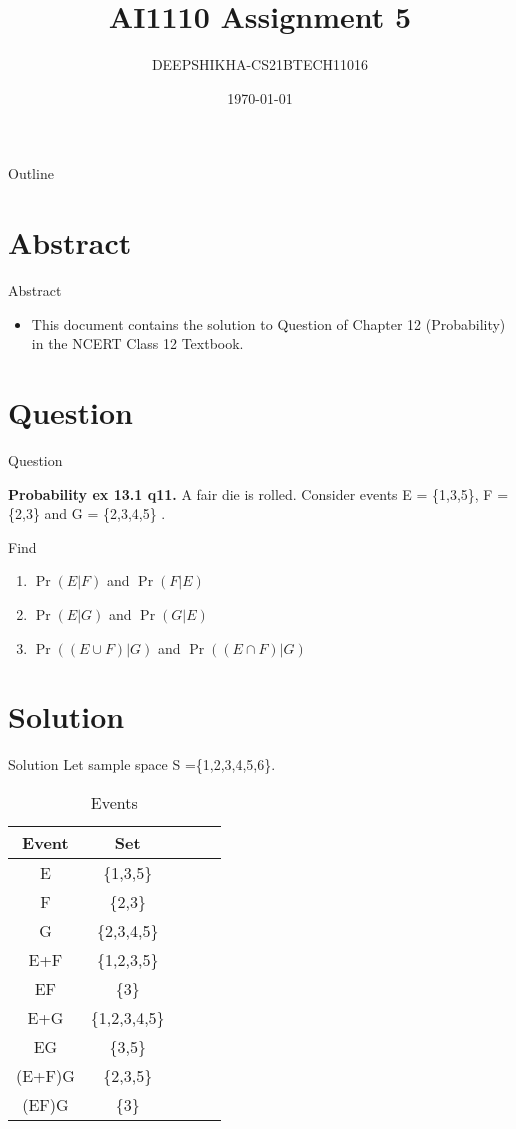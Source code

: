 \documentclass{beamer}
\title{AI1110 Assignment 5}
\author{DEEPSHIKHA-CS21BTECH11016}
\date{\today}
\providecommand{\pr}[1]{\ensuremath{\Pr\left(#1\right)}}
\begin{document}
\begin{frame}
		\titlepage
	\end{frame}

\begin{frame}{Outline}
  \tableofcontents
\end{frame}
\section{Abstract}
	\begin{frame}{Abstract}
		\begin{itemize}
			\item 	This document contains the solution to Question of Chapter 12 (Probability) in the NCERT Class 12 Textbook.
		\end{itemize}
	\end{frame}
	
	
	\section{Question}
	\begin{frame}{Question}
		\begin{block}{\textbf{Probability  ex 13.1 q11.}}
			 A fair die is rolled. Consider events E = \{1,3,5\}, F = \{2,3\} and G = \{2,3,4,5\} .
	
	Find
	\begin{enumerate}
	\item \pr{E|F} and \pr{F|E}
	\item \pr{E|G} and \pr{G|E}
	\item \pr{(E \cup F)|G} and \pr{(E \cap F)|G}
	\end{enumerate}	 
		\end{block}
	
	\end{frame}

	

	\section{Solution}
	\begin{frame}{Solution}
		Let sample space S =\{1,2,3,4,5,6\}.
		\begin{table}[ht!]
	    \centering
	    \begin{tabular}{|c|c|c|c|c|}
	    \hline
	    Event & Set\\
	    \hline\hline
	    E & \{1,3,5\}   \\
	    F &  \{2,3\}    \\
	    G & \{2,3,4,5\} \\
	    E+F & \{1,2,3,5\} \\
	    EF & \{3\} \\
	    E+G & \{1,2,3,4,5\} \\
	    EG & \{3,5\} \\
	   (E+F)G & \{2,3,5\} \\
	   (EF)G & \{3\} \\
	    \hline
	    \end{tabular}
	    \caption{Events}
	    \label{tab:Table1}
	\end{table}
	
	    
	\end{frame}
	
\end{document}
